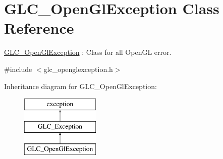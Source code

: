 \hypertarget{class_g_l_c___open_gl_exception}{\section{G\-L\-C\-\_\-\-Open\-Gl\-Exception Class Reference}
\label{class_g_l_c___open_gl_exception}
}


\hyperlink{class_g_l_c___open_gl_exception}{G\-L\-C\-\_\-\-Open\-Gl\-Exception} \-: Class for all Open\-G\-L error.  




{\ttfamily \#include $<$glc\-\_\-openglexception.\-h$>$}

Inheritance diagram for G\-L\-C\-\_\-\-Open\-Gl\-Exception\-:\begin{figure}[H]
\begin{center}
\leavevmode
\includegraphics[height=3.000000cm]{class_g_l_c___open_gl_exception}
\end{center}
\end{figure}

